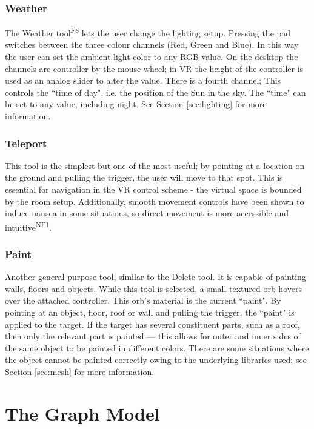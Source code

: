 \subsubsection*{Weather}
The Weather tool\textsuperscript{F8} lets the user change the lighting setup. Pressing the pad switches between the three colour channels (Red, Green and Blue). In this way the user can set the ambient light color to any RGB value. On the desktop the channels are controller by the mouse wheel; in VR the height of the controller is used as an analog slider to alter the value. There is a fourth channel; This controls the ``time of day", i.e. the position of the Sun in the sky. The ``time" can be set to any value, including night. See Section \ref{sec:lighting} for more information.

\subsubsection*{Teleport}
This tool is the simplest but one of the most useful; by pointing at a location on the ground and pulling the trigger, the user will move to that spot. This is essential for navigation in the VR control scheme - the virtual space is bounded by the room setup. Additionally, smooth movement controls have been shown to induce nausea in some situations, so direct movement is more accessible and intuitive\textsuperscript{NF1}.

\subsubsection*{Paint}
Another general purpose tool, similar to the Delete tool. It is capable of painting walls, floors and objects. While this tool is selected, a small textured orb hovers over the attached controller. This orb's material is the current ``paint". By pointing at an object, floor, roof or wall and pulling the trigger, the ``paint" is applied to the target. If the target has several constituent parts, such as a roof, then only the relevant part is painted --- this allows for outer and inner sides of the same object to be painted in different colors. There are some situations where the object cannot be painted correctly owing to the underlying libraries used; see Section \ref{sec:mesh} for more information.


\section{The Graph Model}
\label{sec:graph}

